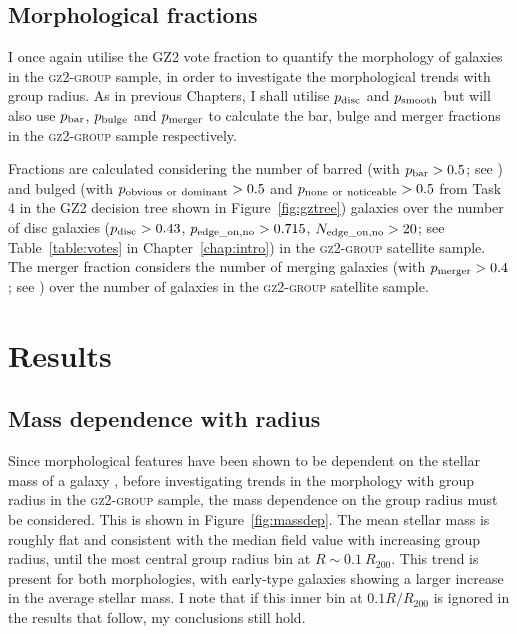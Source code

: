 \subsection{Morphological fractions}\label{sec:morphfrac}

I once again utilise the GZ2 vote fraction to quantify the morphology of galaxies in the \textsc{gz2-group} sample, in order to investigate the morphological trends with group radius. As in previous Chapters, I shall utilise $p_{\rm{disc}}$ and $p_{\rm{smooth}}$ but will also use $p_{\rm{bar}}$, $p_{\rm{bulge}}$ and $p_{\rm{merger}}$ to calculate the bar, bulge and merger fractions in the \textsc{gz2-group} sample respectively. 

Fractions are calculated considering the number of barred (with $p_{\rm{bar}} > 0.5$; see \citealt{masters11a, Cheung13}) and bulged (with $p_{\rm{obvious}~\rm{or}~\rm{dominant}} > 0.5$ and $p_{\rm{none}~\rm{or}~\rm{noticeable}} > 0.5$ from Task 4 in the GZ2 decision tree shown in Figure~\ref{fig:gztree}) galaxies over the number of disc galaxies ($p_{\rm{disc}} > 0.43$, $p_{\rm{edge\_on, no}} > 0.715$, $N_{\rm{edge\_on, no}} > 20$; see Table~\ref{table:votes} in Chapter~\ref{chap:intro}) in the \textsc{gz2-group} satellite sample. The merger fraction considers the number of merging galaxies (with $p_{\rm{merger}} > 0.4$; see \citealt{Darg10a}) over the number of galaxies in the \textsc{gz2-group} satellite sample. 

\section{Results}\label{sec:results}

\subsection{Mass dependence with radius}

Since morphological features have been shown to be dependent on the stellar mass of a galaxy \citep[e.g. the increase in the bar fraction with stellar mass; see][]{nair10, skibba12}, before investigating trends in the morphology with group radius in the \textsc{gz2-group} sample, the mass dependence on the group radius must be considered. This is shown in Figure~\ref{fig:massdep}. The mean stellar mass is roughly flat and consistent with the median field value with increasing group radius, until the most central group radius bin at $R \sim 0.1~R_{200}$. This trend is present for both morphologies, with early-type galaxies showing a larger increase in the average stellar mass. I note that if this inner bin at $0.1 R/R_{200}$ is ignored in the results that follow, my conclusions still hold. 


